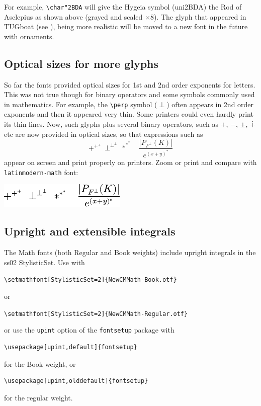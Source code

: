 \documentclass{article}
\begin{document}
For example, \verb|\char"2BDA| will give the Hygeia symbol
(uni2BDA) the Rod of Asclepius as shown above (grayed and scaled $\times 8$). The glyph
that appeared in TUGboat (see \cite{1}), being more realistic will be moved to
a new font in the future with ornaments.

\subsection{Optical sizes for more glyphs}
So far the fonts provided optical sizes for 1st and 2nd order exponents for letters. This was
not true though for binary operators and some symbols commonly used in mathematics.
For example, the \verb|\perp| symbol ($\perp$) often appears in 2nd order exponents
and then it appeared very thin. Some printers could even hardly print its thin lines.
Now, such glyphs plus several binary operators, such as $+$, $-$, $\pm$, $\dotplus$ etc
are now provided in optical sizes, so that expressions such as
$$+^{+^+}\ \perp^{\perp^\perp}\ *^{*^*}\quad\frac{|P_{F^\perp}(K)|}{e^{(x+y)^*}}$$
appear on screen and print properly on printers.
Zoom or print and compare with \texttt{lat\-in\-modern-math} font:
\begin{center}
  \includegraphics{opticalmathlm-cropped.pdf}
\end{center}




\subsection{Upright and extensible integrals}
The Math fonts (both Regular and Book weights) include upright integrals
in the ss02 StylisticSet.
Use with

\medskip

\noindent\verb|\setmathfont[StylisticSet=2]{NewCMMath-Book.otf}|

\noindent or

\noindent\verb|\setmathfont[StylisticSet=2]{NewCMMath-Regular.otf}|

\medskip

\noindent or use the \verb|upint| option of the \texttt{fontsetup} package with
\begin{verbatim}
\usepackage[upint,default]{fontsetup}
\end{verbatim}
for the Book weight, or
\begin{verbatim}
\usepackage[upint,olddefault]{fontsetup}
\end{verbatim}
for the regular weight.
\end{document}
